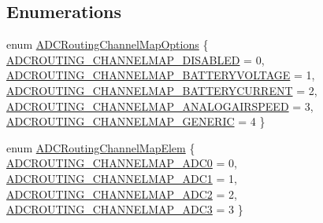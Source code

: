 \subsection*{\-Enumerations}
\begin{DoxyCompactItemize}
\item 
enum \hyperlink{group___a_d_c_routing_gadb6ab7aed5286e9eb440421db03060b3}{\-A\-D\-C\-Routing\-Channel\-Map\-Options} \{ \*
\hyperlink{group___a_d_c_routing_ggadb6ab7aed5286e9eb440421db03060b3adba7767344e4caca84065653b710deaa}{\-A\-D\-C\-R\-O\-U\-T\-I\-N\-G\-\_\-\-C\-H\-A\-N\-N\-E\-L\-M\-A\-P\-\_\-\-D\-I\-S\-A\-B\-L\-E\-D} = 0, 
\hyperlink{group___a_d_c_routing_ggadb6ab7aed5286e9eb440421db03060b3a2b41eeb9f002d456235e3269f04c6440}{\-A\-D\-C\-R\-O\-U\-T\-I\-N\-G\-\_\-\-C\-H\-A\-N\-N\-E\-L\-M\-A\-P\-\_\-\-B\-A\-T\-T\-E\-R\-Y\-V\-O\-L\-T\-A\-G\-E} = 1, 
\hyperlink{group___a_d_c_routing_ggadb6ab7aed5286e9eb440421db03060b3aafac426413a35965f1d405f7e3ae836d}{\-A\-D\-C\-R\-O\-U\-T\-I\-N\-G\-\_\-\-C\-H\-A\-N\-N\-E\-L\-M\-A\-P\-\_\-\-B\-A\-T\-T\-E\-R\-Y\-C\-U\-R\-R\-E\-N\-T} = 2, 
\hyperlink{group___a_d_c_routing_ggadb6ab7aed5286e9eb440421db03060b3ad1ff57be104d27b03e10573dc062b45d}{\-A\-D\-C\-R\-O\-U\-T\-I\-N\-G\-\_\-\-C\-H\-A\-N\-N\-E\-L\-M\-A\-P\-\_\-\-A\-N\-A\-L\-O\-G\-A\-I\-R\-S\-P\-E\-E\-D} = 3, 
\*
\hyperlink{group___a_d_c_routing_ggadb6ab7aed5286e9eb440421db03060b3ac53aea919bc1a30ab3a11c1906273056}{\-A\-D\-C\-R\-O\-U\-T\-I\-N\-G\-\_\-\-C\-H\-A\-N\-N\-E\-L\-M\-A\-P\-\_\-\-G\-E\-N\-E\-R\-I\-C} = 4
 \}
\item 
enum \hyperlink{group___a_d_c_routing_gab37ee7d48f06c925bf28047466a67e94}{\-A\-D\-C\-Routing\-Channel\-Map\-Elem} \{ \hyperlink{group___a_d_c_routing_ggab37ee7d48f06c925bf28047466a67e94ac667fd6b7a5397ea8b7e93d3687c7576}{\-A\-D\-C\-R\-O\-U\-T\-I\-N\-G\-\_\-\-C\-H\-A\-N\-N\-E\-L\-M\-A\-P\-\_\-\-A\-D\-C0} = 0, 
\hyperlink{group___a_d_c_routing_ggab37ee7d48f06c925bf28047466a67e94aa858e6cbaf5ba34529bfff54f0e954ac}{\-A\-D\-C\-R\-O\-U\-T\-I\-N\-G\-\_\-\-C\-H\-A\-N\-N\-E\-L\-M\-A\-P\-\_\-\-A\-D\-C1} = 1, 
\hyperlink{group___a_d_c_routing_ggab37ee7d48f06c925bf28047466a67e94acdeac906e069b0dbf92ea3455c38a45c}{\-A\-D\-C\-R\-O\-U\-T\-I\-N\-G\-\_\-\-C\-H\-A\-N\-N\-E\-L\-M\-A\-P\-\_\-\-A\-D\-C2} = 2, 
\hyperlink{group___a_d_c_routing_ggab37ee7d48f06c925bf28047466a67e94a75a77d7bc0f4f0004948c4741bee956c}{\-A\-D\-C\-R\-O\-U\-T\-I\-N\-G\-\_\-\-C\-H\-A\-N\-N\-E\-L\-M\-A\-P\-\_\-\-A\-D\-C3} = 3
 \}
\end{DoxyCompactItemize}
